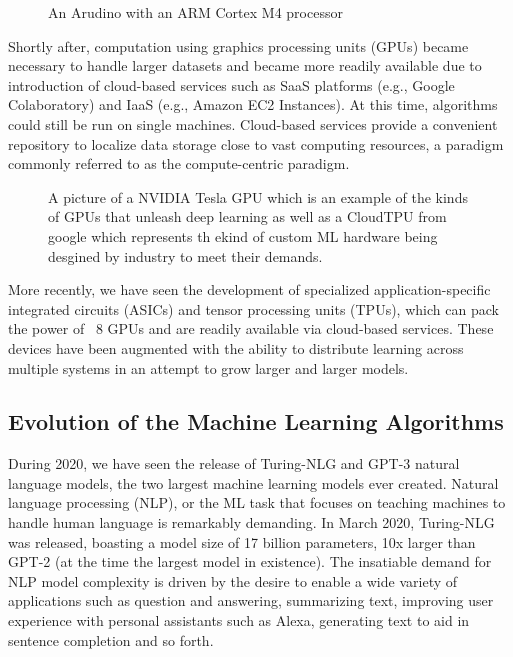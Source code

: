 \begin{figure}
    \caption{An Arudino with an ARM Cortex M4 processor}
\end{figure}  


Shortly after, computation using graphics processing units (GPUs) became necessary to handle larger datasets and became more readily available due to introduction of cloud-based services such as SaaS platforms (e.g., Google Colaboratory) and IaaS (e.g., Amazon EC2 Instances). At this time, algorithms could still be run on single machines. Cloud-based services provide a convenient repository to localize data storage close to vast computing resources, a paradigm commonly referred to as the compute-centric paradigm.


\begin{figure}
    \caption{A picture of a NVIDIA Tesla GPU which is an example of the kinds of GPUs that unleash deep learning as well as a CloudTPU from google which represents th ekind of custom ML hardware being desgined by industry to meet their demands.}
\end{figure}  



More recently, we have seen the development of specialized application-specific integrated circuits (ASICs) and tensor processing units (TPUs), which can pack the power of ~8 GPUs and are readily available via cloud-based services. These devices have been augmented with the ability to distribute learning across multiple systems in an attempt to grow larger and larger models.

\subsection{Evolution of the Machine Learning Algorithms}

During 2020, we have seen the release of Turing-NLG and GPT-3 natural language models, the two largest machine learning models ever created. Natural language processing (NLP), or the ML task that focuses on teaching machines to handle human language is remarkably demanding. In March 2020, Turing-NLG was released, boasting a model size of 17 billion parameters, 10x larger than GPT-2 (at the time the largest model in existence). The insatiable demand for NLP model complexity is driven by the desire to enable a wide variety of applications such as question and answering, summarizing text, improving user experience with personal assistants such as Alexa, generating text to aid in sentence completion and so forth. 

